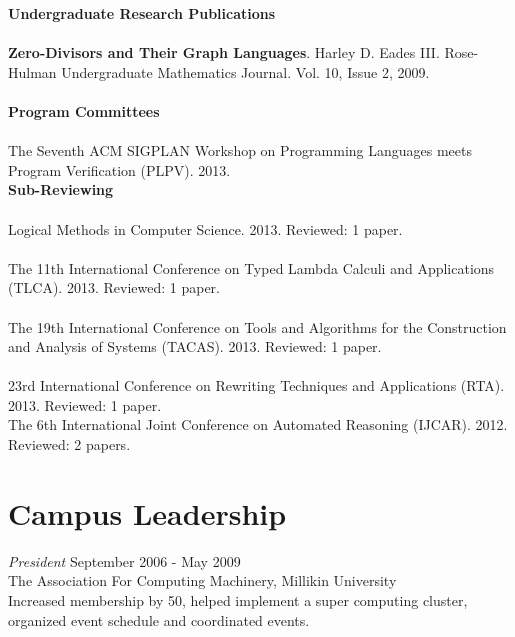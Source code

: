 \documentclass[line,margin]{res}
\begin{document}
\begin{resume}
                  \textbf{\large{Undergraduate Research Publications}}\\
                  \ \\
                  \textbf{Zero-Divisors and Their Graph Languages}. Harley D. Eades III. Rose-Hulman Undergraduate 
                  Mathematics Journal. Vol. 10, Issue 2, 2009. \\
                  \ \\
                  \textbf{\large{Program Committees}}\\
                  \ \\
                  The Seventh ACM SIGPLAN Workshop on Programming Languages meets Program Verification (PLPV). 2013.\\

                  \textbf{\large{Sub-Reviewing}}\\
                  \ \\
                  Logical Methods in Computer Science. 2013. Reviewed: 1 paper.\\
                  \ \\
                  The 11th International Conference on Typed Lambda Calculi and Applications (TLCA). 2013. Reviewed: 1 paper.\\
                  \ \\
                  The 19th International Conference on Tools and Algorithms for the Construction and Analysis of Systems (TACAS).
                  2013. Reviewed: 1 paper.\\
                  \ \\
                  23rd International Conference on Rewriting Techniques and Applications (RTA). 2013. Reviewed: 1 paper.\\
                  
                 \newpage
                  The 6th International Joint Conference on Automated Reasoning (IJCAR). 2012. Reviewed: 2 papers.\\                                    
 \section{\small Campus Leadership} 
                  {\sl President} \hfill September 2006 - May 2009\\
	          The Association For Computing Machinery, Millikin University\\ 
	          Increased membership by 50, helped implement a super computing cluster, organized event schedule and coordinated events.
            

\end{resume}
\end{document}
